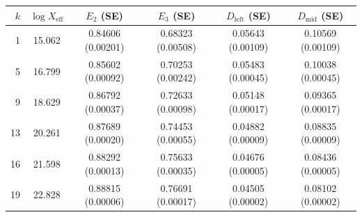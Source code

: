 \begin{tabular}{r c c c c c}
\toprule
$k$ & $\log X_{\mathrm{eff}}$ & $E_2$ (SE) & $E_3$ (SE) & $D_{\mathrm{left}}$ (SE) & $D_{\mathrm{mid}}$ (SE) \\
\midrule
1 & 15.062 & 0.84606 (0.00201) & 0.68323 (0.00508) & 0.05643 (0.00109) & 0.10569 (0.00109) \\
5 & 16.799 & 0.85602 (0.00092) & 0.70253 (0.00242) & 0.05483 (0.00045) & 0.10038 (0.00045) \\
9 & 18.629 & 0.86792 (0.00037) & 0.72633 (0.00098) & 0.05148 (0.00017) & 0.09365 (0.00017) \\
13 & 20.261 & 0.87689 (0.00020) & 0.74453 (0.00055) & 0.04882 (0.00009) & 0.08835 (0.00009) \\
16 & 21.598 & 0.88292 (0.00013) & 0.75633 (0.00035) & 0.04676 (0.00005) & 0.08436 (0.00005) \\
19 & 22.828 & 0.88815 (0.00006) & 0.76691 (0.00017) & 0.04505 (0.00002) & 0.08102 (0.00002) \\
\bottomrule
\end{tabular}